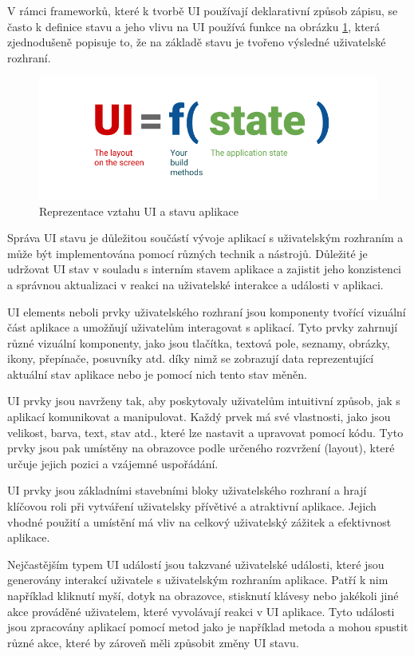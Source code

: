 V rámci frameworků, které k tvorbě UI používají deklarativní způsob zápisu, se často k definice stavu a jeho vlivu na UI používá funkce 
na obrázku \ref{fig:UI_function}, která zjednodušeně popisuje to, že na základě stavu je tvořeno výsledné uživatelské rozhraní.

\begin{figure}[H]
  \centering
  \includegraphics[width=.5\textwidth]{ui-equals-function-of-state.png}
  \caption{Reprezentace vztahu UI a stavu aplikace}
  \label{fig:UI_function}
\end{figure}

Správa UI stavu je důležitou součástí vývoje aplikací s uživatelským rozhraním a může být implementována pomocí různých technik a nástrojů.
Důležité je udržovat UI stav v souladu s interním stavem aplikace a zajistit jeho konzistenci a správnou aktualizaci v reakci na uživatelské 
interakce a události v aplikaci.

UI elements neboli prvky uživatelského rozhraní jsou komponenty tvořící vizuální část aplikace a umožňují uživatelům interagovat s aplikací.
Tyto prvky zahrnují různé vizuální komponenty, jako jsou tlačítka, textová pole, seznamy, obrázky, ikony, přepínače, posuvníky atd. díky nimž
se zobrazují data reprezentující aktuální stav aplikace nebo je pomocí nich tento stav měněn.

UI prvky jsou navrženy tak, aby poskytovaly uživatelům intuitivní způsob, jak s aplikací komunikovat a manipulovat. Každý prvek má své 
vlastnosti, jako jsou velikost, barva, text, stav atd., které lze nastavit a upravovat pomocí kódu. Tyto prvky jsou pak umístěny na obrazovce 
podle určeného rozvržení (layout), které určuje jejich pozici a vzájemné uspořádání.

UI prvky jsou základními stavebními bloky uživatelského rozhraní a hrají klíčovou roli při vytváření uživatelsky přívětivé a atraktivní aplikace. 
Jejich vhodné použití a umístění má vliv na celkový uživatelský zážitek a efektivnost aplikace.

Nejčastějším typem UI událostí jsou takzvané uživatelské události, které jsou generovány interakcí uživatele s uživatelským rozhraním aplikace. 
Patří k nim například kliknutí myší, dotyk na obrazovce, stisknutí klávesy nebo jakékoli jiné akce prováděné uživatelem, které vyvolávají reakci v 
UI aplikace. Tyto události jsou zpracovány aplikací pomocí metod jako je například metoda  a mohou spustit různé akce, které by zároveň
měli způsobit změny UI stavu.

